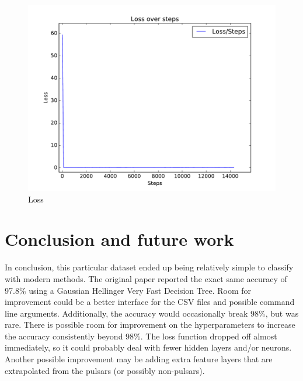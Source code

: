 \documentclass{article}
\begin{document}
    \begin{figure}[H]
    \begin{center}
    \includegraphics[scale=0.75]{images/Loss}
    \caption{Loss}\label{img:loss}
    \end{center}
    \end{figure}
\section{Conclusion and future work}
    In conclusion, this particular dataset ended up being relatively simple to 
    classify with modern methods. The original paper reported the exact same 
    accuracy of 97.8\% using a Gaussian Hellinger Very Fast Decision Tree. Room 
    for improvement could be a better interface for the CSV files and possible 
    command line arguments. Additionally, the accuracy would occasionally break 
    98\%, but was rare. There is possible room for improvement on the 
    hyperparameters to increase the accuracy consistently beyond 98\%. The loss 
    function dropped off almost immediately, so it could probably deal with 
    fewer hidden layers and/or neurons. Another possible improvement may be 
    adding extra feature layers that are extrapolated from the pulsars (or 
    possibly non-pulsars).
    


\end{document}
